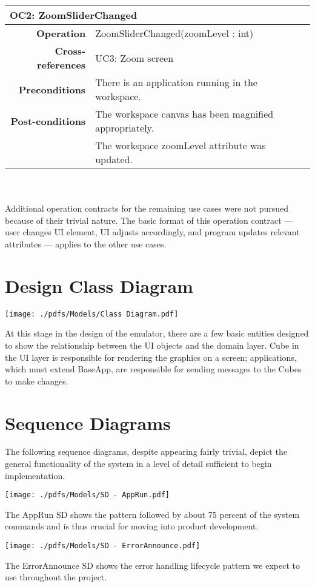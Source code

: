 \documentclass[12pt]{article}
\begin{document}
\begin{tabular*}{\textwidth}{r | l}
  \multicolumn{2}{l}{\textbf{OC2: ZoomSliderChanged}} \\ \hline
  \textbf{Operation} & ZoomSliderChanged(zoomLevel : int) \\
  \textbf{Cross-references} & UC3: Zoom screen \\
  \textbf{Preconditions} & There is an application running in the workspace. \\
  \textbf{Post-conditions} & The workspace canvas has been magnified appropriately. \\
                           & The workspace zoomLevel attribute was updated. \\ \hline
\end{tabular*} \\\\

Additional operation contracts for the remaining use cases were not pursued because of their trivial nature. The basic format of this operation contract --- user changes UI element, UI adjusts accordingly, and program updates relevant attributes --- applies to the other use cases.

\clearpage

\section{Design Class Diagram}
\begin{center}
        \texttt{[image: ./pdfs/Models/Class Diagram.pdf]}
\end{center}
At this stage in the design of the emulator, there are a few basic entities designed to show the relationship between the UI objects and the domain layer. Cube in the UI layer is responsible for rendering the graphics on a screen; applications, which must extend BaseApp, are responsible for sending messages to the Cubes to make changes.

\section{Sequence Diagrams}
The following sequence diagrams, despite appearing fairly trivial, depict the general functionality of the system in a level of detail sufficient to begin implementation. 
\begin{center}
        \texttt{[image: ./pdfs/Models/SD - AppRun.pdf]}
\end{center}
The AppRun SD shows the pattern followed by about 75 percent of the system commands and is thus crucial for moving into product development.
\begin{center}
        \texttt{[image: ./pdfs/Models/SD - ErrorAnnounce.pdf]}
\end{center}
The ErrorAnnounce SD shows the error handling lifecycle pattern we expect to use throughout the project.
        
\end{document}
